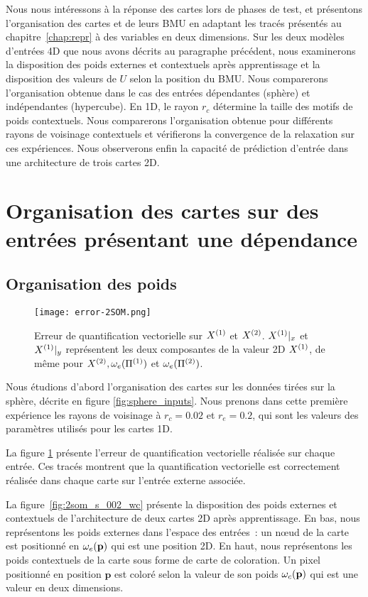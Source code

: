 \documentclass[../main]{subfiles}
\begin{document}
Nous nous intéressons à la réponse des cartes lors de phases de test, et présentons l'organisation des cartes et de leurs BMU en adaptant les tracés présentés au chapitre~\ref{chap:repr} à des variables en deux dimensions.
Sur les deux modèles d'entrées 4D que nous avons décrits au paragraphe précédent, nous examinerons la disposition des poids externes et contextuels après apprentissage et la disposition des valeurs de $U$ selon la position du BMU. Nous comparerons l'organisation obtenue dans le cas des entrées dépendantes (sphère) et indépendantes (hypercube).
En 1D, le rayon $r_c$ détermine la taille des motifs de poids contextuels. Nous comparerons l'organisation obtenue pour différents rayons de voisinage contextuels et vérifierons la convergence de la relaxation sur ces expériences. Nous observerons enfin la capacité de prédiction d'entrée dans une architecture de trois cartes 2D.

\section{Organisation des cartes sur des entrées présentant une dépendance \label{par:orga2D}}

\subsection{Organisation des poids}

\begin{figure}[h]
	\centering\texttt{[image: error-2SOM.png]}
	\caption{Erreur de quantification vectorielle sur $X^{({1})}$ et $X^{({2})}$. $X^{({1})}|_x$ et $X^{({1})}|_y$ représentent les deux composantes de la valeur 2D $X^{({1})}$, de même pour $X^{({2})}, \omega_e(\Pi^{({1})})$ et  $\omega_e(\Pi^{({2})})$. \label{fig:err_2D}}
\end{figure}

Nous étudions d'abord l'organisation des cartes sur les données tirées sur la sphère, décrite en figure \ref{fig:sphere_inputs}. 
Nous prenons dans cette première expérience les rayons de voisinage à $r_c = 0.02$ et $r_e = 0.2$, qui sont les valeurs des paramètres utilisés pour les cartes 1D.

La figure \ref{fig:err_2D} présente l'erreur de quantification vectorielle réalisée sur chaque entrée. Ces tracés montrent que la quantification vectorielle est correctement réalisée dans chaque carte sur l'entrée externe associée.

La figure~\ref{fig:2som_s_002_wc} présente la disposition des poids externes et contextuels de l'architecture de deux cartes 2D après apprentissage.
En bas, nous représentons les poids externes dans l'espace des entrées~: un n\oe{}ud de la carte est positionné en $\omega_e(\mathbf{p})$ qui est une position 2D.
En haut, nous représentons les poids contextuels de la carte sous forme de carte de coloration. Un pixel positionné en position $\mathbf{p}$ est coloré selon la valeur de son poids $\omega_c(\mathbf{p})$ qui est une valeur en deux dimensions.
\end{document}
